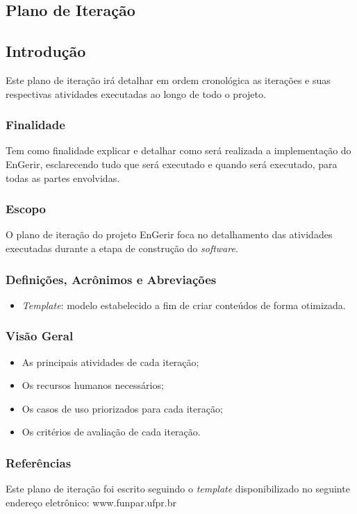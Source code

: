\begin{apendicesenv}
\chapter{Plano de Iteração}
\label{iteration}


\section{Introdução}
Este plano de iteração irá detalhar em ordem cronológica as iterações e suas respectivas atividades executadas ao longo de todo o projeto.

\subsection{Finalidade}
Tem como finalidade explicar e detalhar como será realizada a implementação do EnGerir, esclarecendo tudo que será executado e quando será executado, para todas as partes envolvidas.

\subsection{Escopo}
O plano de iteração do projeto EnGerir foca no detalhamento das atividades executadas durante a etapa de construção do \textit{software}.

\subsection{Definições, Acrônimos e Abreviações}
\begin{itemize}
\item \textit{Template}: modelo estabelecido a fim de criar conteúdos de forma otimizada.
\end{itemize}

\subsection{Visão Geral}
\begin{itemize}
\item As principais atividades de cada iteração;
\item Os recursos humanos necessários;
\item Os casos de uso priorizados para cada iteração;
\item Os critérios de avaliação de cada iteração.
\end{itemize}

\subsection{Referências}
Este plano de iteração foi escrito seguindo o \textit{template} disponibilizado no seguinte endereço eletrônico: www.funpar.ufpr.br


\end{apendicesenv}
